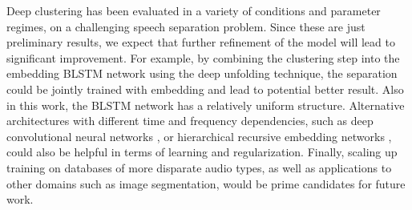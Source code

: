 \documentclass[9pt]{article} \usepackage{nips15submit_e,times}
\begin{document}
Deep clustering has been evaluated in a variety of conditions and parameter regimes, on  a challenging speech separation problem.  Since these are just preliminary results, we expect that further refinement of the model will lead to significant improvement. For example, by combining the clustering step into the embedding BLSTM network using the deep unfolding technique\cite{Hershey2014arXiv09}, the separation could be jointly trained with embedding and lead to potential better result. Also in this work, the BLSTM network has a relatively uniform structure. Alternative architectures with different time and frequency dependencies, such as deep convolutional neural networks \cite{farabet2013learning}, or hierarchical recursive embedding networks \cite{sharma2014recursive}, could also be helpful in terms of learning and regularization.   Finally, scaling up training on databases of more disparate audio types, as well as applications to other domains such as image segmentation, would be prime candidates for future work.  








\clearpage



\small{
	


	
}
\end{document}
